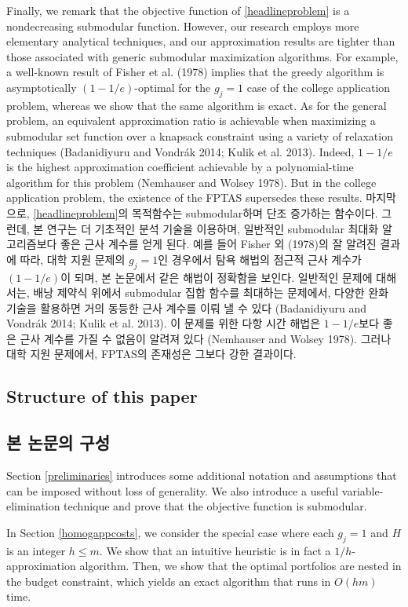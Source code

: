 \documentclass[11pt]{article} %
\theoremstyle{definition}
\theoremstyle{definition}
\begin{document}
\ifen
Finally, we remark that the objective function of \eqref{headlineproblem} is a nondecreasing submodular function. However, our research employs more elementary analytical techniques, and our approximation results are tighter than those associated with generic submodular maximization algorithms. For example, a well-known result of Fisher et al. (1978) implies that the greedy algorithm is asymptotically $(1 - 1/e)$-optimal for the $g_j = 1$ case of the college application problem, whereas we show that the same algorithm is exact. As for the general problem, an equivalent approximation ratio is achievable when maximizing a submodular set function over a knapsack constraint using a variety of relaxation techniques (Badanidiyuru and Vondrák 2014; Kulik et al. 2013). Indeed, $1 - 1/e$ is the highest approximation coefficient achievable by a polynomial-time algorithm for this problem (Nemhauser and Wolsey 1978). But in the college application problem, the existence of the FPTAS supersedes these results.
\else
마지막으로, \eqref{headlineproblem}의 목적함수는 submodular하며 단조 증가하는 함수이다. 그런데, 본 연구는 더 기초적인 분석 기술을 이용하며, 일반적인 submodular 최대화 알고리즘보다 좋은 근사 계수를 얻게 된다. 예를 들어 Fisher 외 (1978)의 잘 알려진 결과에 따라, 대학 지원 문제의 $g_j = 1$인 경우에서 탐욕 해법의 점근적 근사 계수가 $(1 - 1/e)$이 되며, 본 논문에서 같은 해법이 정확함을 보인다. 일반적인 문제에 대해서는, 배낭 제약식 위에서 submodular 집합 함수를 최대하는 문제에서, 다양한 완화 기술을 활용하면 거의 동등한 근사 계수를 이뤄 낼 수 있다 (Badanidiyuru and Vondrák 2014; Kulik et al. 2013). 이 문제를 위한 다항 시간 해법은 $1 - 1/e$보다 좋은 근사 계수를 가질 수 없음이 알려져 있다 (Nemhauser and Wolsey 1978). 그러나 대학 지원 문제에서, FPTAS의 존재성은 그보다 강한 결과이다.
\fi

\ifen \subsection{Structure of this paper} \else \subsection{본 논문의 구성}\fi
\ifen Section \ref{preliminaries} introduces some additional notation and assumptions that can be imposed without loss of generality. We also introduce a useful variable-elimination technique and prove that the objective function is submodular. 

In Section \ref{homogappcosts}, we consider the special case where each $g_j = 1$ and $H$ is an integer $h \leq m$.  We show that an intuitive heuristic is in fact a $1/h$-approximation algorithm. Then, we show that the optimal portfolios are nested in the budget constraint, which yields an exact algorithm that runs in $O(hm)$ time. 
\end{document}
